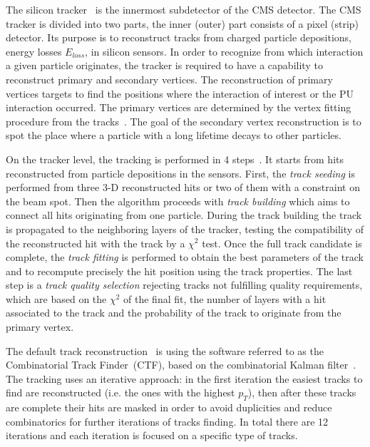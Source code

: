 The silicon tracker~\cite{CMS:1997tlf, CMS:2000eqx} is the innermost subdetector of the CMS detector. The CMS tracker is divided into two parts, the inner (outer) part consists of a pixel (strip) detector.  Its purpose is to reconstruct tracks from charged particle depositions, energy losses $E_{loss}$, in silicon sensors. In order to recognize from which interaction a given particle originates, the tracker is required to have a capability to reconstruct primary and secondary vertices. The reconstruction of primary vertices targets to find the positions where the interaction of interest or the PU interaction occurred. The primary vertices are determined by the vertex fitting procedure from the tracks~\cite{Ball:2007zza}. The goal of the secondary vertex reconstruction is to spot the place where a particle with a long lifetime decays to other particles. 

On the tracker level, the tracking is performed in 4 steps~\cite{website:slidesTracking, website:twikiTracking}. It starts from  hits reconstructed from particle depositions in the sensors. First, the \textit{track seeding} is performed from three 3-D reconstructed hits or two of them with a constraint on the beam spot. Then the algorithm proceeds with \textit{track building} which aims to connect all hits originating from one particle. During the track building the track is propagated to the neighboring layers of the tracker, testing the compatibility of the reconstructed hit with the track by a $\chi^{2}$ test. Once the full track candidate is complete, the \textit{track fitting} is performed to obtain the best parameters of the track and to recompute precisely the hit position using the track properties. The last step is a \textit{track quality selection} rejecting tracks not fulfilling quality requirements, which are based on the $\chi^{2}$ of the final fit, the number of layers with a hit associated to the track and the probability of the track  to originate from the primary vertex.

The default track reconstruction~\cite{Chatrchyan:2014fea} is using the software referred to as the Combinatorial Track Finder~(CTF), based on the combinatorial Kalman filter~\cite{Fruhwirth:1987fm}. The tracking uses an iterative approach: in the first iteration the easiest tracks to find are reconstructed (i.e. the ones with the highest $p_{T}$), then after these tracks are complete their hits are masked in order to avoid duplicities and reduce combinatorics for further iterations of tracks finding. In total there are 12 iterations and each iteration is focused on a specific type of tracks.


